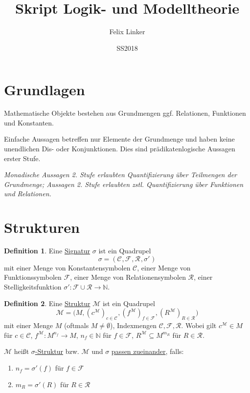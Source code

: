 \documentclass{article}
\title{Skript Logik- und Modelltheorie}
\author{Felix Linker}
\date{SS2018}
\theoremstyle{definition}
\newtheorem{dfn}{Definition}[section]
\theoremstyle{plain}
\newcommand{\calC}{\mathcal{C}}
\newcommand{\calF}{\mathcal{F}}
\newcommand{\calM}{\mathcal{M}}
\newcommand{\calR}{\mathcal{R}}
\newcommand{\sign}[1]{(\calC_{#1}, \calF_{#1}, \calR_{#1}, \sigma'_{#1})}
\newcommand{\struc}[3]{\big(#1, (c^{#2})_{c \in \calC_{#3}}, (f^{#2})_{f \in \calF_{#3}}, (R^{#2})_{R \in \calR_{#3}}\big)}
\begin{document}
    \maketitle

    \section*{Grundlagen}

    Mathematische Objekte bestehen aus Grundmengen ggf. Relationen, Funktionen und Konstanten.

    Einfache Aussagen betreffen nur Elemente der Grundmenge und haben keine unendlichen Dis- oder Konjunktionen.
    Dies sind prädikatenlogische Aussagen erster Stufe.

    \textit{Monadische Aussagen 2. Stufe erlaubten Quantifizierung über Teilmengen der Grundmenge; Aussagen 2. Stufe erlaubten zstl. Quantifizierung über Funktionen und Relationen.}

    \section{Strukturen}

    \begin{dfn}
        Eine \underline{Signatur} $ \sigma $ ist ein Quadrupel
        \begin{equation}
            \sigma = \sign{}
        \end{equation}
        mit einer Menge von Konstantensymbolen $ \calC $, einer Menge von Funktionssymbolen $ \calF $, einer Menge von Relationensymbolen $ \calR $, einer Stelligkeitsfunktion $ \sigma' : \calF \cup \calR \rightarrow \mathbb{N} $.
    \end{dfn}

    \begin{dfn}
        Eine \underline{Struktur} $ \calM $ ist ein Quadrupel
        \begin{equation}
            \calM = \struc{M}{\calM}{}
        \end{equation}
        mit einer Menge $ M $ (oftmals $ M \neq \emptyset $), Indexmengen $ \calC, \calF, \calR $.
        Wobei gilt $ c^\calM \in M $ für $ c \in \calC $, $ f^\calM : M^{n_f} \rightarrow M $, $ n_f \in \mathbb{N} $ für $ f \in \calF $, $ R^\calM \subseteq M^{m_R} $ für $ R \in \calR $.
    \end{dfn}

    $ \calM $ heißt \underline{$ \sigma $-Struktur} bzw. $ \calM $ und $ \sigma $ \underline{passen zueinander}, falls:
    \begin{enumerate}
        \item $ n_f = \sigma'(f) $ für $ f \in \calF $
        \item $ m_R = \sigma'(R) $ für $ R \in \calR $
    \end{enumerate}
\end{document}
